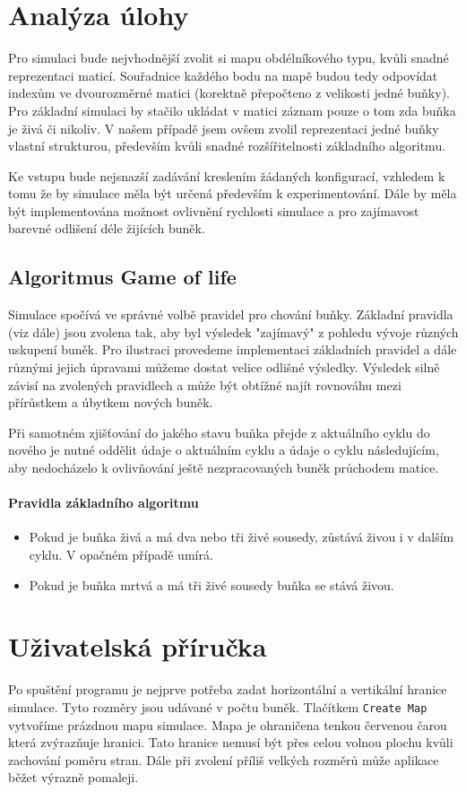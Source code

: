 \documentclass[12pt]{article}
\begin{document}
\section{Analýza úlohy}
Pro simulaci bude nejvhodnější zvolit si mapu obdélníkového typu, kvůli snadné reprezentaci maticí. Souřadnice každého bodu na mapě budou tedy odpovídat indexům ve dvourozměrné matici (korektně přepočteno z velikosti jedné buňky). Pro základní simulaci by stačilo ukládat v matici záznam pouze o tom zda buňka je živá či nikoliv. V našem případě jsem ovšem zvolil reprezentaci jedné buňky vlastní strukturou, především kvůli snadné rozšířitelnosti základního algoritmu. 

Ke vstupu bude nejsnazší zadávání kreslením žádaných konfigurací, vzhledem k tomu že by simulace měla být určená především k experimentování. Dále by měla být implementována možnost ovlivnění rychlosti simulace a pro zajímavost barevné odlišení déle žijících buněk.

\subsection{Algoritmus Game of life}
Simulace spočívá ve správné volbě pravidel pro chování buňky. Základní pravidla (viz dále) jsou zvolena tak, aby byl výsledek "zajímavý" z pohledu vývoje různých uskupení buněk. Pro ilustraci provedeme implementaci základních pravidel a dále různými jejich úpravami můžeme dostat velice odlišné výsledky. Výsledek silně závisí na zvolených pravidlech a může být obtížné najít rovnováhu mezi přírůstkem a úbytkem nových buněk. 

Při samotném zjišťování do jakého stavu buňka přejde z aktuálního cyklu do nového je nutné oddělit údaje o aktuálním cyklu a údaje o cyklu následujícím, aby nedocházelo k ovlivňování ještě nezpracovaných buněk průchodem matice.

\paragraph{Pravidla základního algoritmu}
\label{basic_algorithm_rule}
\begin{itemize}
\item Pokud je buňka živá a má dva nebo tři živé sousedy, zůstává živou i v dalším cyklu. V opačném případě umírá.
\item Pokud je buňka mrtvá a má tři živé sousedy buňka se stává živou.
\end{itemize}

\section{Uživatelská příručka}
Po spuštění programu je nejprve potřeba zadat horizontální a vertikální hranice simulace. Tyto rozměry jsou udávané v počtu buněk. Tlačítkem \texttt{Create Map} vytvoříme prázdnou mapu simulace. Mapa je ohraničena tenkou červenou čarou která zvýrazňuje hranici. Tato hranice nemusí být přes celou volnou plochu kvůli zachování poměru stran. Dále při zvolení příliš velkých rozměrů může aplikace běžet výrazně pomaleji.
\end{document}
